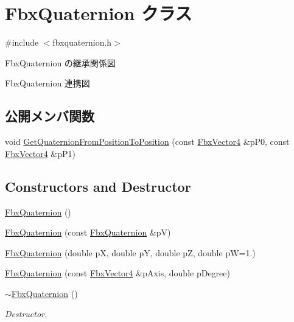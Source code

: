 \hypertarget{class_fbx_quaternion}{}\section{Fbx\+Quaternion クラス}
\label{class_fbx_quaternion}


{\ttfamily \#include $<$fbxquaternion.\+h$>$}



Fbx\+Quaternion の継承関係図


Fbx\+Quaternion 連携図
\subsection*{公開メンバ関数}
\begin{DoxyCompactItemize}
\item 
void \hyperlink{class_fbx_quaternion_ae81b85793e46d5a69d2aaed1be7e403e}{Get\+Quaternion\+From\+Position\+To\+Position} (const \hyperlink{class_fbx_vector4}{Fbx\+Vector4} \&p\+P0, const \hyperlink{class_fbx_vector4}{Fbx\+Vector4} \&p\+P1)
\end{DoxyCompactItemize}
\subsection*{Constructors and Destructor}
\begin{DoxyCompactItemize}
\item 
\hyperlink{class_fbx_quaternion_acfb222e84428e32ecc6258f1d18fc92b}{Fbx\+Quaternion} ()
\item 
\hyperlink{class_fbx_quaternion_ab7bef8e0e53bb3b70cf9f290ce315f50}{Fbx\+Quaternion} (const \hyperlink{class_fbx_quaternion}{Fbx\+Quaternion} \&pV)
\item 
\hyperlink{class_fbx_quaternion_ab5e4be6b3c78205ac8d0da97b6c53998}{Fbx\+Quaternion} (double pX, double pY, double pZ, double pW=1.)
\item 
\hyperlink{class_fbx_quaternion_a96686af15a5328f30dd098168480ada2}{Fbx\+Quaternion} (const \hyperlink{class_fbx_vector4}{Fbx\+Vector4} \&p\+Axis, double p\+Degree)
\item 
\hyperlink{class_fbx_quaternion_a87fbbab5cf65d9721289aec5a11444f3}{$\sim$\+Fbx\+Quaternion} ()
\begin{DoxyCompactList}\small\item\em Destructor. \end{DoxyCompactList}\end{DoxyCompactItemize}
